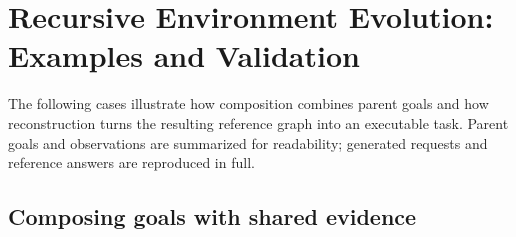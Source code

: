 \section{Recursive Environment Evolution: Examples and Validation}
\label{app:synthesis}

The following cases illustrate how composition combines parent goals and how reconstruction turns the resulting reference graph into an executable task. Parent goals and observations are summarized for readability; generated requests and reference answers are reproduced in full.

\subsection{Composing goals with shared evidence}
\label{app:composition-case}

